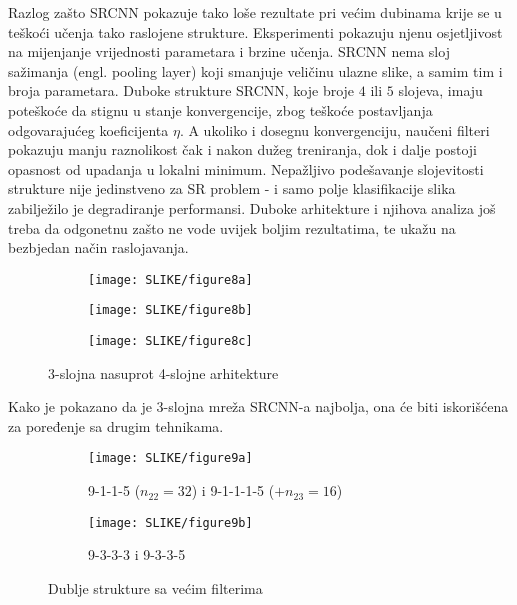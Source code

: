 \documentclass[12pt]{report}
\numberwithin{equation}{section}
\begin{document}
  Razlog zašto SRCNN pokazuje tako loše rezultate pri većim dubinama krije se u teškoći učenja tako raslojene strukture. Eksperimenti pokazuju njenu osjetljivost na mijenjanje vrijednosti parametara i brzine učenja. SRCNN nema sloj sažimanja (engl. pooling layer)  koji smanjuje veličinu ulazne slike, a samim tim i broja parametara. Duboke strukture SRCNN, koje broje $4$ ili $5$ slojeva, imaju poteškoće da stignu u stanje konvergencije, zbog teškoće postavljanja odgovarajućeg koeficijenta $\eta$. A ukoliko i dosegnu konvergenciju, naučeni filteri pokazuju manju raznolikost čak i nakon dužeg treniranja, dok i dalje postoji opasnost od upadanja u lokalni minimum. Nepažljivo podešavanje slojevitosti strukture nije jedinstveno za SR problem - i samo polje klasifikacije slika zabilježilo je degradiranje performansi. Duboke arhitekture i njihova analiza još treba da odgonetnu zašto ne vode uvijek boljim rezultatima, te ukažu na bezbjedan način raslojavanja. 
 
 
\begin{figure}[h]
\begin{subfigure}{0.5\textwidth}
  \centering
  \texttt{[image: SLIKE/figure8a]}
  \label{fig:8sfig1}
\end{subfigure}
\vspace{-20pt}
\begin{subfigure}{0.5\textwidth}
  \centering
  \texttt{[image: SLIKE/figure8b]}
  \label{fig:8sfig2}
\end{subfigure}
\begin{subfigure}{0.5\textwidth}
  \centering
  \texttt{[image: SLIKE/figure8c]}
  \label{fig:8sfig3}
\end{subfigure}
\caption{3-slojna nasuprot 4-slojne arhitekture}
\label{fig:ogled8}
\end{figure}

     Kako je pokazano da je $3$-slojna mreža SRCNN-a najbolja, ona će biti iskorišćena za poređenje sa drugim tehnikama.      

\begin{figure}[h]
\begin{subfigure}{0.5\textwidth}
  \centering
   \caption{9-1-1-5 ($n_{22}=32$) i 9-1-1-1-5 ($+ n_{23}=16$)}
  \texttt{[image: SLIKE/figure9a]}
  \label{fig:ogled91}
\end{subfigure}
\vspace{-20pt}
\begin{subfigure}{0.5\textwidth}
  \centering
    \caption{9-3-3-3 i 9-3-3-5}
  \texttt{[image: SLIKE/figure9b]}
  \label{fig:ogled92}
\end{subfigure}
\caption{Dublje strukture sa većim filterima}
\label{fig:ogled9}
\end{figure}
\newpage
\end{document}
